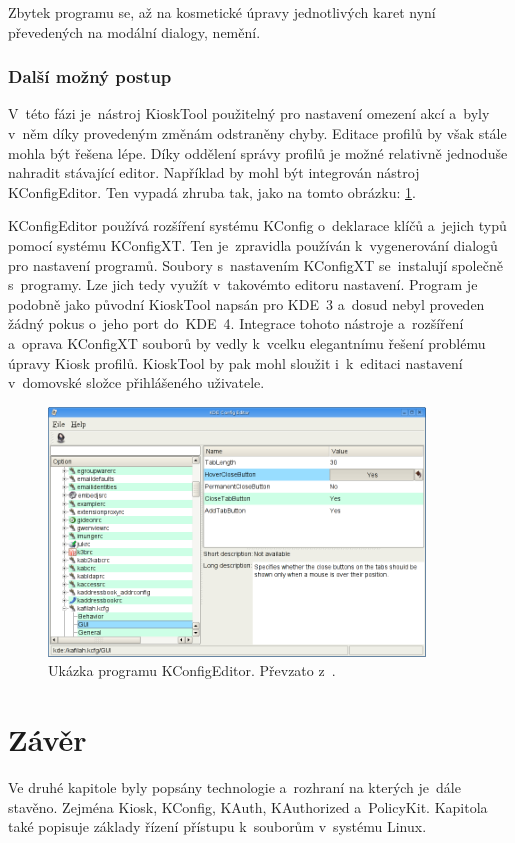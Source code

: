 Zbytek programu se, až na kosmetické úpravy jednotlivých karet nyní převedených na modální dialogy, nemění.

\subsection*{Další možný postup}
V~této fázi je~nástroj KioskTool použitelný pro nastavení omezení akcí a~byly v~něm díky provedeným změnám odstraněny chyby. Editace profilů by však stále mohla být řešena lépe. Díky oddělení správy profilů je možné relativně jednoduše nahradit stávající editor. Například by mohl být integrován nástroj KConfigEditor\cite{KConfigEditor}. Ten vypadá zhruba tak, jako na tomto obrázku: \ref{fig:kconfeditor}.

KConfigEditor používá rozšíření systému KConfig o~deklarace klíčů a~jejich typů pomocí systému KConfigXT. Ten je~zpravidla používán k~vygenerování dialogů pro nastavení programů. Soubory s~nastavením KConfigXT se~instalují společně s~programy. Lze jich tedy využít v~takovémto editoru nastavení. Program je podobně jako původní KioskTool napsán pro KDE~3 a~dosud nebyl proveden žádný pokus o~jeho port do~KDE~4. Integrace tohoto nástroje a~rozšíření a~oprava KConfigXT souborů by vedly k~vcelku elegantnímu řešení problému úpravy Kiosk profilů. KioskTool by pak mohl sloužit i~k~editaci nastavení v~domovské složce přihlášeného uživatele.

\begin{figure}[h]
    \centering
    \includegraphics[width=10cm]{obrazky/kconfigeditor1.png}
    \caption{Ukázka programu KConfigEditor. Převzato z~\cite{KConfigEditor}.}
    \label{fig:kconfeditor}
\end{figure}


\chapter{Závěr}
Ve druhé kapitole byly popsány technologie a~rozhraní na kterých je~dále stavěno. Zejména Kiosk, KConfig, KAuth, KAuthorized a~PolicyKit. Kapitola také popisuje základy řízení přístupu k~souborům v~systému Linux.

